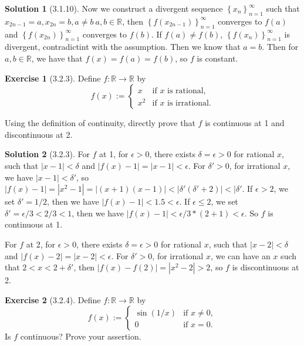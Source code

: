 \documentclass{article}
\theoremstyle{definition}
\newtheorem{exe}{Exercise}[section]
\newtheorem{sol}{Solution}[exe]
\begin{document}
\begin{sol}[3.1.10]
Now we construct a divergent sequence $\left\{x_{n}\right\}_{n=1}^{\infty}$ such that $x_{2n-1}=a,x_{2n}=b,a\neq b\ a,b\in \mathbb{R}$, then
$\left\{f(x_{2n-1})\right\}_{n=1}^{\infty}$ converges to $f(a)$ and $\left\{f(x_{2n})\right\}_{n=1}^{\infty}$ converges to $f(b)$. If $f(a)\neq f(b)$, $\left\{f(x_{n})\right\}_{n=1}^{\infty}$ is divergent, contradictint with the assumption. Then we know that $a=b$. 
Then for $a,b\in \mathbb{R}$, we have that $f(x)=f(a)=f(b)$, so $f$ is constant.
\end{sol}


\begin{exe}[3.2.3]
    Define \( f: \mathbb{R} \rightarrow \mathbb{R} \) by
\[ f(x) := \begin{cases} 
x & \text{if } x \text{ is rational,} \\
x^2 & \text{if } x \text{ is irrational.}
\end{cases} \]

Using the definition of continuity, directly prove that \( f \) is continuous at 1 and discontinuous at 2.

\end{exe}

\begin{sol}[3.2.3]
For $f$ at 1, for $\epsilon>0$, there exists $\delta=\epsilon>0$ for rational $x$, such that $|x-1|<\delta$ and $|f(x)-1|=|x-1|<\epsilon$. For $\delta'>0$, for irrational $x$, we have $|x-1|<\delta'$, 
so $|f(x)-1|=|x^2-1|=|(x+1)(x-1)|<|\delta'(\delta'+2)|<|\delta'$. If $\epsilon>2$, we set $\delta'=1/2$, then we have $|f(x)-1|<1.5<\epsilon$. If 
$\epsilon \leq 2$, we set $\delta'= \epsilon/3<2/3<1$, then we have $|f(x)-1|<\epsilon/3*(2+1)<\epsilon$. So $f$ is continuous at 1.

For $f$ at 2, for $\epsilon>0$, there exists $\delta=\epsilon>0$ for rational $x$, such that $|x-2|<\delta$ and $|f(x)-2|=|x-2|<\epsilon$. For $\delta'>0$, for irrational $x$, we can have an $x$ such that $2<x<2+\delta'$, then
$|f(x)-f(2)|=|x^2-2|>2$, so $f$ is discontinuous at 2.
\end{sol}


\begin{exe}[3.2.4]
    Define \( f: \mathbb{R} \rightarrow \mathbb{R} \) by
\[ f(x) := \begin{cases} 
\sin(1/x) & \text{if } x \neq 0, \\
0 & \text{if } x = 0.
\end{cases} \]
Is \( f \) continuous? Prove your assertion.
\end{exe}
\end{document}
